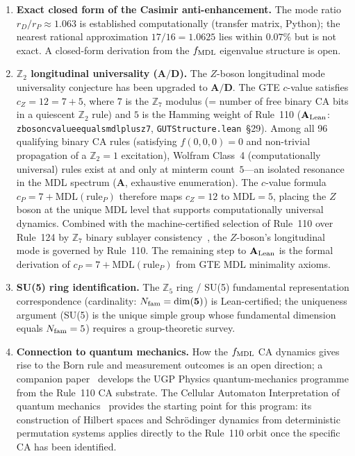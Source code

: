 \documentclass[11pt]{article}
\theoremstyle{remark}
\newcommand{\Nfam}{N_{\rm fam}}
\newcommand{\lean}[1]{%
  \penalty-100
  \begingroup\def\_{\textunderscore\allowbreak}\texttt{#1}\endgroup}
\newcommand{\CatA}{\textbf{A}}
\newcommand{\CatAL}{\ensuremath{\textbf{A}_{\rm Lean}}}
\newcommand{\CatAD}{\textbf{A/D}}
\begin{document}
\begin{enumerate}[leftmargin=1.5em]
\item \textbf{Exact closed form of the Casimir anti-enhancement.}
  The mode ratio $r_D/r_P \approx 1.063$ is established computationally
  (transfer matrix, Python); the nearest rational approximation $17/16 = 1.0625$
  lies within $0.07\%$ but is not exact.
  A closed-form derivation from the $f_{\rm MDL}$ eigenvalue structure is open.

\item \textbf{$\mathbb{Z}_2$ longitudinal universality ($\CatAD$).}
  The $Z$-boson longitudinal mode universality conjecture has been
  upgraded to $\CatAD$.
  The GTE $c$-value satisfies $c_Z = 12 = 7 + 5$, where $7$ is the
  $\mathbb{Z}_7$ modulus (= number of free binary CA bits in a quiescent
  $\mathbb{Z}_2$ rule) and $5$ is the Hamming weight of Rule~110
  ($\CatAL$: \lean{z\_boson\_cvalue\_equals\_mdl\_plus\_z7},
  \texttt{GUTStructure.lean}~\S29).
  Among all 96 qualifying binary CA rules (satisfying $f(0,0,0)=0$ and
  non-trivial propagation of a $\mathbb{Z}_2 = 1$ excitation), Wolfram
  Class~4 (computationally universal) rules exist at and only at minterm
  count~$5$---an isolated resonance in the MDL spectrum
  ($\CatA$, exhaustive enumeration).
  The $c$-value formula $c_P = 7 + \mathrm{MDL}(\text{rule}_P)$ therefore
  maps $c_Z = 12$ to $\mathrm{MDL} = 5$, placing the $Z$ boson at the
  unique MDL level that supports computationally universal dynamics.
  Combined with the machine-certified selection of Rule~110 over Rule~124
  by $\mathbb{Z}_7$ binary sublayer consistency~\cite{SpivackCompUniversality},
  the $Z$-boson's longitudinal mode is governed by Rule~110.
  The remaining step to $\CatAL$ is the formal derivation of
  $c_P = 7 + \mathrm{MDL}(\text{rule}_P)$ from GTE MDL minimality axioms.

\item \textbf{SU(5) ring identification.}
  The $\mathbb{Z}_5$ ring / SU(5) fundamental representation correspondence
  (cardinality: $\Nfam = \dim(\mathbf{5})$) is Lean-certified; the uniqueness
  argument (SU(5) is the unique simple group whose fundamental dimension
  equals $\Nfam = 5$) requires a group-theoretic survey.

\item \textbf{Connection to quantum mechanics.}
  How the $f_{\rm MDL}$ CA dynamics gives rise to the Born rule and
  measurement outcomes is an open direction; a companion paper~\cite{SpivackQMFromR110}
  develops the UGP Physics quantum-mechanics programme from the Rule~110 CA substrate.
  The Cellular Automaton Interpretation of quantum mechanics~\cite{tHooft2016CA}
  provides the starting point for this program:
  its construction of Hilbert spaces and Schrödinger dynamics from deterministic
  permutation systems applies directly to the Rule~110 orbit once the specific
  CA has been identified.


\end{enumerate}
\end{document}
